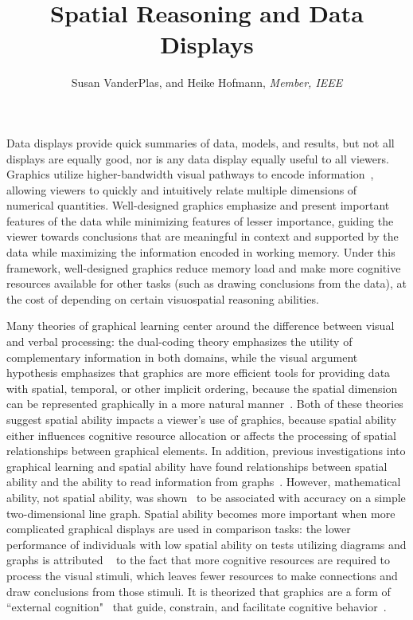 \documentclass[journal]{vgtc}\usepackage[]{graphicx}\usepackage[]{color}
\title{Spatial Reasoning and Data Displays}
\author{Susan VanderPlas, and Heike Hofmann, \textit{Member, IEEE}}
\begin{document}


\maketitle

\label{sec:introduction}Data displays provide quick summaries of data, models, and results, but not all displays are equally good, nor is any data display equally useful to all viewers. 
Graphics utilize higher-bandwidth visual pathways to encode information~\cite{baddeley1974working}, allowing viewers to quickly and intuitively relate multiple dimensions of numerical quantities.
Well-designed graphics emphasize and present important features of the data while minimizing  features of lesser importance, guiding the viewer towards conclusions that are meaningful in context and supported by the data while maximizing the information encoded in working memory. Under this framework, well-designed graphics reduce memory load and make more cognitive resources available for other tasks (such as drawing conclusions from the data), at the cost of depending on certain visuospatial reasoning abilities. 

Many theories of graphical learning center around the difference between visual and verbal processing: the dual-coding theory emphasizes the utility of complementary information in both domains, while the visual argument hypothesis emphasizes that graphics are more efficient tools for providing data with spatial, temporal, or other implicit ordering, because the spatial dimension can be represented graphically in a more natural manner~\cite{vekiri2002value}. Both of these theories suggest spatial ability impacts a viewer's use of graphics, because spatial ability either influences cognitive resource allocation or affects the processing of spatial relationships between graphical elements. In addition, previous investigations into graphical learning and spatial ability have found relationships between spatial ability and the ability to read information from graphs~\cite{lowrie2007solving}. 
However,  mathematical ability, not spatial ability, was shown~\cite{shah1995conceptual} to be associated with accuracy on a simple two-dimensional line graph. 
Spatial ability becomes more important when more complicated graphical displays are used in comparison tasks: the lower performance of individuals with low spatial ability on tests utilizing diagrams and graphs is attributed ~\cite{mayer1994whom} to the fact that more cognitive resources are required to process the visual stimuli, which leaves fewer resources to make connections and draw conclusions from those stimuli. It is theorized that graphics are a form of ``external cognition"~\cite{scaife1996external} that guide, constrain, and facilitate cognitive behavior~\cite{zhang1997nature}. 
\end{document}
